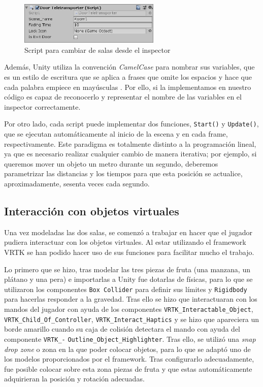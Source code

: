 \begin{figure}[!h]
\begin{center}
\includegraphics[width=0.6\textwidth]{imagenes/7/door-teleporter-inspector.jpg}
\caption{Script para cambiar de salas desde el inspector}
\label{fig:door-teleporter-inspector}
\end{center}
\end{figure}

Además, Unity utiliza la convención \textit{CamelCase} para nombrar sus variables, que es un estilo de escritura que se aplica a frases que omite los espacios y hace que cada palabra empiece en mayúsculas . Por ello, si la implementamos en nuestro código es capaz de reconocerlo y representar el nombre de las variables en el inspector correctamente.

Por otro lado, cada script puede implementar dos funciones, \texttt{Start()} y \texttt{Update()}, que se ejecutan automáticamente al inicio de la escena y en cada frame, respectivamente. Este paradigma es totalmente distinto a la programación lineal, ya que es necesario realizar cualquier cambio de manera iterativa; por ejemplo, si queremos mover un objeto un metro durante un segundo, deberemos parametrizar las distancias y los tiempos para que esta posición se actualice, aproximadamente, sesenta veces cada segundo.

\subsection{Interacción con objetos virtuales}

Una vez modeladas las dos salas, se comenzó a trabajar en hacer que el jugador pudiera interactuar con los objetos virtuales. Al estar utilizando el framework \acs{VRTK} se han podido hacer uso de sus funciones para facilitar mucho el trabajo.

Lo primero que se hizo, tras modelar las tres piezas de fruta (una manzana, un plátano y una pera) e importarlas a Unity fue dotarlas de físicas, para lo que se utilizaron los componentes \texttt{Box Collider} para definir sus límites y \texttt{Rigidbody} para hacerlas responder a la gravedad. Tras ello se hizo que interactuaran con los mandos del jugador con ayuda de los componentes \texttt{VRTK\_Interactable\_Object}, \texttt{VRTK\_Child\_Of\_Controller}, \texttt{VRTK\_Interact\_Haptics} y se hizo que apareciera un borde amarillo cuando su caja de colisión detectara el mando con ayuda del componente \texttt{VRTK\_-} \texttt{Outline\_Object\_Highlighter}. Tras ello, se utilizó una \textit{snap drop zone} o zona en la que poder colocar objetos, para lo que se adaptó uno de los modelos proporcionados por el framework. Tras configurarlo adecuadamente, fue posible colocar sobre esta zona piezas de fruta y que estas automáticamente adquirieran la posición y rotación adecuadas.

